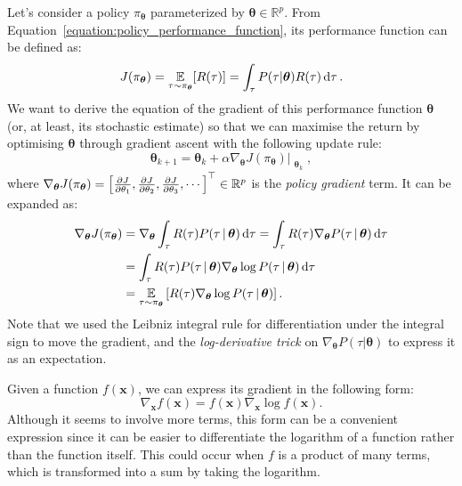 Let's consider a policy $\pi_{\boldsymbol{\theta}}$ parameterized by $\boldsymbol{\theta} \in \mathbb{R}^p$.
From Equation~\eqref{equation:policy_performance_function}, its performance function can be defined as:
%
\begin{equation}
    \label{equation:policy_performance_for_policy_gradient_derivation}
    J(\pi_{\boldsymbol{\theta}}) = \operatorname*{\mathbb{E}}_{\tau \sim \pi_{\boldsymbol{\theta}}} [ R(\tau) ] = \int_\tau P(\tau|\boldsymbol{\theta}) R(\tau) \dd{\tau} .
\end{equation}
%
We want to derive the equation of the gradient of this performance function \wrt $\boldsymbol{\theta}$ (or, at least, its stochastic estimate) so that we can maximise the return by optimising $\boldsymbol{\theta}$ through gradient ascent with the following update rule:
%
\begin{equation}
    \boldsymbol{\theta}_{k+1} =
    \boldsymbol{\theta}_k + \alpha \nabla_{\boldsymbol{\theta}} J(\pi_{\boldsymbol{\theta}})\Bigr|_{\substack{\boldsymbol{\theta}_k}} ,
\end{equation}
%
where $\nabla_{\boldsymbol{\theta}} J(\pi_{\boldsymbol{\theta}}) = \left[ \pdv{J}{\theta_1}, \pdv{J}{\theta_2}, \pdv{J}{\theta_3}, \cdots \right]^\top \in \mathbb{R}^p$ is the \emph{policy gradient} term.
It can be expanded as:
%
\begin{align*}
    \nabla_{\boldsymbol{\theta}} J(\pi_{\boldsymbol{\theta}})
    &= \nabla_{\boldsymbol{\theta}} \int_\tau R(\tau) P(\tau \operatorname{\mid} \boldsymbol{\theta}) \dd{\tau}
    = \int_\tau R(\tau) \nabla_{\boldsymbol{\theta}} P(\tau \operatorname{\mid} \boldsymbol{\theta}) \dd{\tau} \\
    &= \int_\tau R(\tau) P(\tau \operatorname{\mid} \boldsymbol{\theta}) \nabla_{\boldsymbol{\theta}} \log P(\tau \operatorname{\mid} \boldsymbol{\theta}) \dd{\tau} \\
    &= \operatorname*{\mathbb{E}}_{\tau \sim \pi_{\boldsymbol{\theta}}} \left[ R(\tau) \nabla_{\boldsymbol{\theta}} \log P(\tau \operatorname{\mid} \boldsymbol{\theta}) \right]
    .
\end{align*}
%
Note that we used the Leibniz integral rule for differentiation under the integral sign to move the gradient, and the \emph{log-derivative trick} on $\nabla_{\boldsymbol{\theta}} P(\tau|\boldsymbol{\theta})$ to express it as an expectation.
%
\begin{theorem}
    Given a function $f(\boldsymbol{x})$, we can express its gradient in the following form:
    \begin{equation}
        \label{equation:log_derivative_trick}
        \nabla_{\boldsymbol{x}} f(\boldsymbol{x}) = f(\boldsymbol{x}) \nabla_{\boldsymbol{x}} \log f(\boldsymbol{x}) .
    \end{equation}
    Although it seems to involve more terms, this form can be a convenient expression since it can be easier to differentiate the logarithm of a function rather than the function itself.
    This could occur when $f$ is a product of many terms, which is transformed into a sum by taking the logarithm.
\end{theorem}
